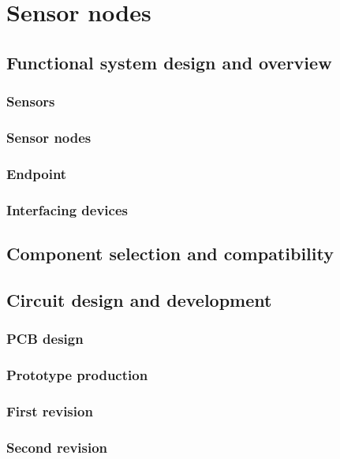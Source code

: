 \chapter{Sensor nodes}

\section{Functional system design and overview}

\subsection{Sensors}
\subsection{Sensor nodes}
\subsection{Endpoint}
\subsection{Interfacing devices}

\section{Component selection and compatibility}

\section{Circuit design and development}

\subsection{PCB design}
\subsection{Prototype production}
\subsection{First revision}
\subsection{Second revision}
